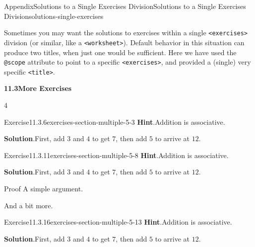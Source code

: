 \documentclass[twoside,10pt,]{article}
\newcommand{\blocktitlefont}{\relax}
\newcommand{\mono}[1]{\texttt{#1}}
\numberwithin{equation}{section}
\begin{document}
%
\begin{solutions-section}{Appendix}{Solutions to a Single Exercises Division}{}{Solutions to a Single Exercises Division}{}{}{solutions-single-exercises}
%
\begin{introduction}{}%
Sometimes you may want the solutions to exercises within a single \mono{<exercises>} division (or similar, like a \mono{<worksheet>}).  Default behavior in this situation can produce two titles, when just one would be sufficient.  Here we have used the \mono{@scope} attribute to point to a specific \mono{<exercises>}, and provided a (single) very specific \mono{<title>}.%
\end{introduction}%
\par\medskip
\noindent\textbf{\large{}11.3\space\textperiodcentered\space{}More Exercises}
\begin{exercisegroupcol}{4}
\begin{divisionsolutionegcol}{Exercise}{11.3.6}{}{exercises-section-multiple-5-3}%
\noindent\textbf{\blocktitlefont Hint}.\hypertarget{exercises-section-multiple-5-3-2-back}{}\quad{}Addition is associative.%
\par\smallskip%
\noindent\textbf{\blocktitlefont Solution}.\hypertarget{exercises-section-multiple-5-3-4-back}{}\quad{}First, add \(3\) and \(4\) to get \(7\), then add \(5\) to arrive at \(12\).%
\end{divisionsolutionegcol}%
\begin{divisionsolutionegcol}{Exercise}{11.3.11}{}{exercises-section-multiple-5-8}%
\noindent\textbf{\blocktitlefont Hint}.\hypertarget{exercises-section-multiple-5-8-2-back}{}\quad{}Addition is associative.%
\par\smallskip%
\noindent\textbf{\blocktitlefont Solution}.\hypertarget{exercises-section-multiple-5-8-4-back}{}\quad{}First, add \(3\) and \(4\) to get \(7\), then add \(5\) to arrive at \(12\).%
\begin{solutionproof}{Proof}
A simple argument.%
\end{solutionproof}
And a bit more.%
\end{divisionsolutionegcol}%
\begin{divisionsolutionegcol}{Exercise}{11.3.16}{}{exercises-section-multiple-5-13}%
\noindent\textbf{\blocktitlefont Hint}.\hypertarget{exercises-section-multiple-5-13-2-back}{}\quad{}Addition is associative.%
\par\smallskip%
\noindent\textbf{\blocktitlefont Solution}.\hypertarget{exercises-section-multiple-5-13-4-back}{}\quad{}First, add \(3\) and \(4\) to get \(7\), then add \(5\) to arrive at \(12\).%

\end{divisionsolutionegcol}
\end{exercisegroupcol}
\end{solutions-section}
\end{document}
